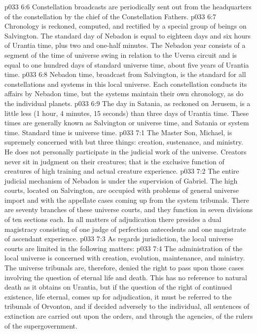 \vs p033 6:6 Constellation broadcasts are periodically sent out from the headquarters of the constellation by the chief of the Constellation Fathers.
\pc \vs p033 6:7 Chronology is reckoned, computed, and rectified by a special group of beings on Salvington. The standard day of Nebadon is equal to eighteen days and six hours of Urantia time, plus two and one\hyp{}half minutes. The Nebadon year consists of a segment of the time of universe swing in relation to the Uversa circuit and is equal to one hundred days of standard universe time, about five years of Urantia time.
\vs p033 6:8 Nebadon time, broadcast from Salvington, is the standard for all constellations and systems in this local universe. Each constellation conducts its affairs by Nebadon time, but the systems maintain their own chronology, as do the individual planets.
\vs p033 6:9 The day in Satania, as reckoned on Jerusem, is a little less (1 hour, 4 minutes, 15 seconds) than three days of Urantia time. These times are generally known as Salvington or universe time, and Satania or system time. Standard time is universe time.
\vs p033 7:1 The Master Son, Michael, is supremely concerned with but three things: creation, sustenance, and ministry. He does not personally participate in the judicial work of the universe. Creators never sit in judgment on their creatures; that is the exclusive function of creatures of high training and actual creature experience.
\vs p033 7:2 The entire judicial mechanism of Nebadon is under the supervision of Gabriel. The high courts, located on Salvington, are occupied with problems of general universe import and with the appellate cases coming up from the system tribunals. There are seventy branches of these universe courts, and they function in seven divisions of ten sections each. In all matters of adjudication there presides a dual magistracy consisting of one judge of perfection antecedents and one magistrate of ascendant experience.
\vs p033 7:3 As regards jurisdiction, the local universe courts are limited in the following matters:
\pc \vs p033 7:4 \bibnobreakspace The administration of the local universe is concerned with creation, evolution, maintenance, and ministry. The universe tribunals are, therefore, denied the right to pass upon those cases involving the question of eternal life and death. This has no reference to natural death as it obtains on Urantia, but if the question of the right of continued existence, life eternal, comes up for adjudication, it must be referred to the tribunals of Orvonton, and if decided adversely to the individual, all sentences of extinction are carried out upon the orders, and through the agencies, of the rulers of the supergovernment.\plusone
